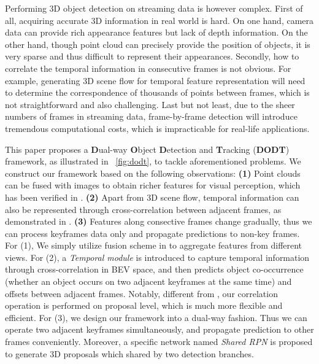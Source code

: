 \documentclass[letterpaper, 10pt, conference]{ieeeconf}  %
\begin{document}
Performing 3D object detection on streaming data is however complex. First of all, acquiring accurate 3D information in real world is hard. On one hand, camera data can provide rich appearance features but lack of depth information. On the other hand, though point cloud can precisely provide the position of objects, it is very sparse and thus difficult to represent their appearances. Secondly, how to correlate the temporal information in consecutive frames is not obvious. For example, generating 3D scene flow for temporal feature representation will need to determine the correspondence of thousands of points between frames, which is not straightforward and also challenging. Last but not least, due to the sheer numbers of frames in streaming data, frame-by-frame detection will introduce tremendous computational costs, which is impracticable for real-life applications. 

This paper proposes a \textbf{D}ual-way \textbf{O}bject \textbf{D}etection and \textbf{T}racking (\textbf{DODT}) framework, as illustrated in \figurename \, \ref{fig:dodt}, to tackle aforementioned problems. We construct our framework based on the following observations: \textbf{(1)} Point clouds can be fused with images to obtain richer features for visual perception, which has been verified in \cite{chen2017multi, ku2018joint}. \textbf{(2)} Apart from 3D scene flow, temporal information can also be represented through cross-correlation between adjacent frames, as demonstrated in \cite{feichtenhofer2017detect}. \textbf{(3)} Features along consective frames change gradually, thus we can process keyframes data only and propagate predictions to non-key frames. For (1), We simply utilize fusion scheme in \cite{ku2018joint} to aggregate features from different views. For (2), a \textit{Temporal module} is introduced to capture temporal information through cross-correlation in BEV space, and then predicts object co-occurrence (whether an object occurs on two adjacent keyframes at the same time) and offsets between adjacent frames. Notably, different from \cite{feichtenhofer2017detect, dosovitskiy2015flownet},  our correlation operation is performed on proposal level, which is much more flexible and efficient. For (3), we design our framework into a dual-way fashion. Thus we can operate two adjacent keyframes simultaneously, and propagate prediction to other frames conveniently. Moreover, a specific network named \textit{Shared RPN} is proposed to generate 3D proposals which shared by two detection branches. 
\end{document}
